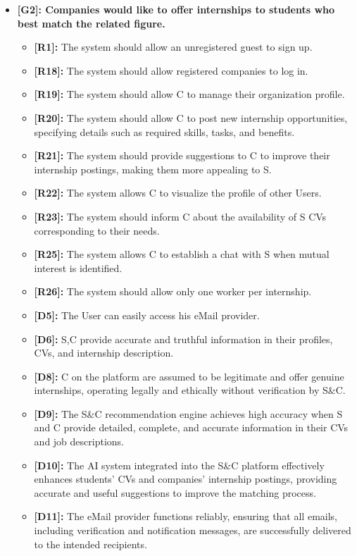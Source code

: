 \begin{itemize}
\item
  \textbf{[G2]: Companies would like to offer internships to
  students who best match the related figure.}

  \begin{itemize}
  \item
    \textbf{[R1]:} The system should allow an unregistered guest to sign up.
  \item
    \textbf{[R18]:} The system should allow registered companies to log in.
  \item
    \textbf{[R19]:} The system should allow C to manage their organization profile.
  \item
    \textbf{[R20]:} The system should allow C to post new internship
    opportunities, specifying details such as required skills, tasks,
    and benefits.
  \item
    \textbf{[R21]:} The system should provide suggestions to C to improve
    their internship postings, making them more appealing to S.
  \item
    \textbf{[R22]:} The system allows C to visualize the profile of other
    Users.
  \item
    \textbf{[R23]:} The system should inform C about the availability of S CVs corresponding to their needs.
  \item
    \textbf{[R25]:} The system allows C to establish a chat with S when mutual interest is identified.
  \item
    \textbf{[R26]:} The system should allow only one worker per internship.
  \item
    \textbf{[D5]:} The User can easily access his eMail provider.
  \item
    \textbf{[D6]:} S,C provide accurate and truthful information in their
    profiles, CVs, and internship description.
  \item
    \textbf{[D8]:} C on the platform are assumed to be legitimate and offer
    genuine internships, operating legally and ethically without
    verification by S\&C.
  \item
    \textbf{[D9]:} The S\&C recommendation engine achieves high accuracy when
    S and C provide detailed, complete, and accurate information in
    their CVs and job descriptions.
\newpage
  \item
    \textbf{[D10]:} The AI system integrated into the S\&C platform
    effectively enhances students' CVs and
    companies' internship postings, providing accurate
    and useful suggestions to improve the matching process.
  \item
    \textbf{[D11]:} The eMail provider functions reliably, ensuring that all emails, including verification and notification messages, are successfully delivered to the intended recipients.
  \end{itemize}
\end{itemize}

